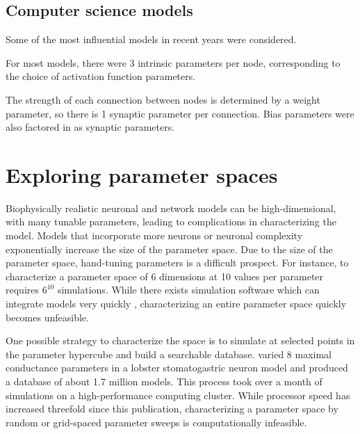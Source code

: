 \documentclass[a4paper,10pt]{article} %
\begin{document}
\subsection{Computer science models}

Some of the most influential models in recent years were considered.

For most models, there were 3 intrinsic parameters per node,
corresponding to the choice of activation function parameters.

The strength of each connection between nodes is determined by a weight parameter,
so there is 1 synaptic parameter per connection.
Bias parameters were also factored in as synaptic parameters.

\section{Exploring parameter spaces}

Biophysically realistic neuronal and network models can be high-dimensional, with many tunable parameters,
leading to complications in characterizing the model.
Models that incorporate more neurons or neuronal complexity exponentially increase the size of the parameter space.
Due to the size of the parameter space, hand-tuning parameters is a difficult prospect.
For instance, to characterize a parameter space of 6 dimensions at 10 values per parameter requires $6^{10}$ simulations.
While there exists simulation software which can integrate models very quickly
\parencite{gorur-shandilyaXolotlIntuitiveApproachable2018, bretteSimulationNetworksSpiking2007},
characterizing an entire parameter space quickly becomes unfeasible.

One possible strategy to characterize the space is to simulate at selected points in the parameter hypercube
and build a searchable database. \cite{prinzAlternativeHandtuningConductancebased2003}
varied 8 maximal conductance parameters in a lobster stomatogastric neuron model
and produced a database of about 1.7 million models.
This process took over a month of simulations on a high-performance computing cluster.
While processor speed has increased threefold since this publication,
characterizing a parameter space by random or grid-spaced parameter sweeps is computationally infeasible.
\end{document}
